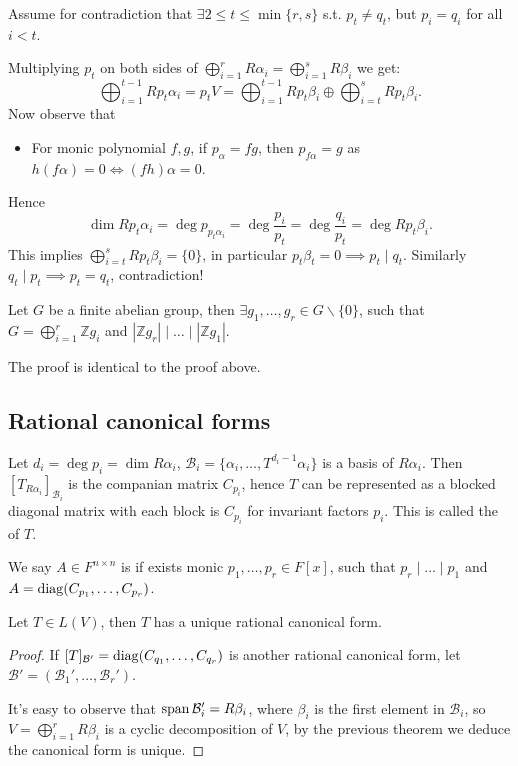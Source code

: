 Assume for contradiction that $\exists 2\le t\le \min\{r,s\}$ s.t.
$p_t\ne q_t$, but $p_i=q_i$ for all $i<t$.

Multiplying $p_t$ on both sides of $\bigoplus_{i=1}^r R\alpha_i
= \bigoplus_{i=1}^s R\beta_i$ we get:
\[
\bigoplus _{i=1}^{t-1} Rp_t\alpha_i = p_tV
= \bigoplus _{i=1}^{t-1}Rp_t\beta_i \oplus \bigoplus_{i=t}^s Rp_t\beta_i.
\]
Now observe that
\begin{itemize}
	\item For monic polynomial $f,g$, if $p_\alpha = fg$,
		then  $p_{f\alpha} = g$ as $h(f\alpha) = 0\iff (fh)\alpha = 0$.
\end{itemize}

Hence
\[
	\dim Rp_t\alpha_i = \deg p_{p_t\alpha_i} = \deg \frac{p_i}{p_t}
	= \deg \frac{q_i}{p_t} = \deg Rp_t\beta_i.
\]
This implies $\bigoplus_{i=t}^s Rp_t\beta_i = \{0\}$,
in particular $p_t\beta_t = 0\implies p_t\mid q_t$.
Similarly $q_t\mid p_t \implies p_t = q_t$, contradiction!

\begin{theorem}
    Let $G$ be a finite abelian group, then $\exists g_1,\dots,g_r\in G\backslash\{0\}$,
	such that $G = \bigoplus_{i=1}^r \mathbb{Z}g_i$ and
	$|\mathbb{Z}g_r| \mid \dots \mid |\mathbb{Z}g_1|$.
\end{theorem}
\begin{remark}
    The proof is identical to the proof above.
\end{remark}

\subsection{Rational canonical forms}
\label{sub:Rational canonical forms}

Let $d_i = \deg p_i = \dim R\alpha_i$,
$\mathcal{B}_i = \{\alpha_i,\dots,T^{d_i-1}\alpha_i\}$ is a basis of $R\alpha_i$.
Then $[T_{R\alpha_i}]_{\mathcal{B}_i}$ is the companian matrix $C_{p_i}$,
hence $T$ can be represented as a blocked diagonal matrix with
each block is $C_{p_i}$ for invariant factors $p_i$.
This is called the  of $T$.

\begin{definition}
	We say $A\in F^{n\times n}$ is  if exists monic $p_1,\dots,p_r\in F[x]$,
	such that $p_r\mid \dots \mid p_1$ and $A = \operatorname{diag}(C_{p_1},\dots,C_{p_r})$.
\end{definition}

\begin{theorem}
    Let $T\in L(V)$, then $T$ has a unique rational canonical form.
\end{theorem}
\begin{proof}[Proof]
	If $[T]_{\mathcal{B}'}=\operatorname{diag}(C_{q_1},\dots,C_{q_r})$ is another
	rational canonical form, let $\mathcal{B}' = (\mathcal{B}_1',\dots,\mathcal{B}_r')$.

	It's easy to observe that $\operatorname{span} \mathcal{B}_i' = R\beta_i$, where
	$\beta_i$ is the first element in $\mathcal{B}_i$,
	so $V = \bigoplus_{i=1}^r R\beta_i$ is a cyclic decomposition of $V$,
	by the previous theorem we deduce the canonical form is unique.
\end{proof}
